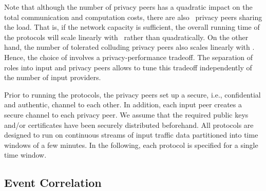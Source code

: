 \documentclass[letterpaper,11pt,onecolumn,titlepage]{article}
\begin{document}
Note that although the number of privacy peers  has a quadratic
impact on the total communication and computation costs, there are also~ privacy
peers sharing the load. That is, if the network capacity is sufficient, the overall running time of the
protocols will scale linearly with~ rather than quadratically.
On the other hand, the number of tolerated colluding privacy peers
also scales linearly with . Hence, the choice of  involves a privacy-performance tradeoff. The separation of
roles into input and privacy peers allows to tune this tradeoff independently of the number of input providers.

Prior to running the protocols, the  privacy peers set up a secure,
i.e., confidential and authentic, channel to each other. In
addition, each input peer creates a secure channel to each
privacy peer. We assume that the required public keys and/or
certificates have been securely distributed beforehand. 
All protocols are designed to run on continuous streams of input traffic data partitioned into time windows of a few minutes. In the following,
each protocol is specified for a single time window.


\subsection{Event Correlation}
\label{sec:ec}
\end{document}

